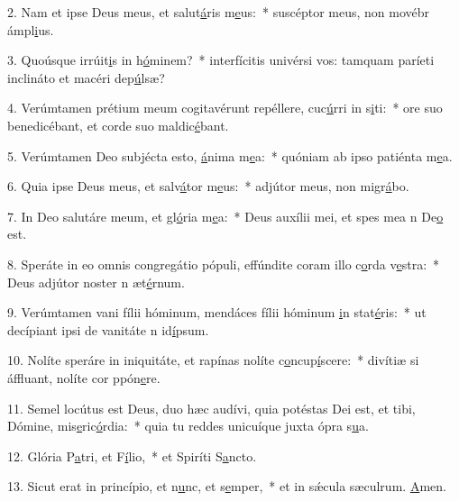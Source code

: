 2. Nam et ipse Deus meus, et salut\uline{á}ris m\uline{e}us:~* suscéptor meus, non movébr ámpl\uline{i}us.\par 
3. Quoúsque irrúit\uline{i}s in h\uline{ó}minem?~* interfícitis univérsi vos: tamquam paríeti inclináto et macéri dep\uline{ú}lsæ?\par 
4. Verúmtamen prétium meum cogitavérunt repéllere, cuc\uline{ú}rri in s\uline{i}ti:~* ore suo benedicébant, et corde suo maldic\uline{é}bant.\par 
5. Verúmtamen Deo subjécta esto, \uline{á}nima m\uline{e}a:~* quóniam ab ipso patiénta m\uline{e}a.\par 
6. Quia ipse Deus meus, et salv\uline{á}tor m\uline{e}us:~* adjútor meus, non migr\uline{á}bo.\par 
7. In Deo salutáre meum, et gl\uline{ó}ria m\uline{e}a:~* Deus auxílii mei, et spes mea n De\uline{o} est.\par 
8. Speráte in eo omnis congregátio pópuli, effúndite coram illo c\uline{o}rda v\uline{e}stra:~* Deus adjútor noster n æt\uline{é}rnum.\par 
9. Verúmtamen vani fílii hóminum, mendáces fílii hóminum \uline{i}n stat\uline{é}ris:~* ut decípiant ipsi de vanitáte n id\uline{í}psum.\par 
10. Nolíte speráre in iniquitáte, et rapínas nolíte c\uline{o}ncup\uline{í}scere:~* divítiæ si áffluant, nolíte cor ppón\uline{e}re.\par 
11. Semel locútus est Deus, duo hæc audívi, quia potéstas Dei est, et tibi, Dómine, mis\uline{e}ric\uline{ó}rdia:~* quia tu reddes unicuíque juxta ópra s\uline{u}a.\par 
12. Glória P\uline{a}tri, et F\uline{í}lio,~* et Spiríti S\uline{a}ncto.\par 
13. Sicut erat in princípio, et n\uline{u}nc, et s\uline{e}mper,~* et in sǽcula sæculrum. \uline{A}men.\par 
